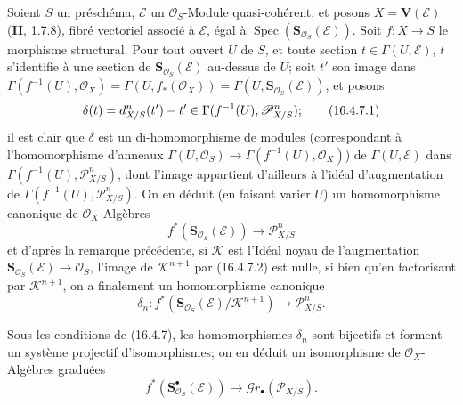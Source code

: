 \begin{env}[16.4.7]
\label{IV.16.4.7}
Soient $S$ un préschéma, $\mathscr{E}$ un $\mathcal{O}_S$-Module
quasi-cohérent, et posons $X=\mathbf{V}(\mathscr{E})$ (\textbf{II}, 1.7.8), fibré
vectoriel associé à $\mathscr{E}$, égal à
$\operatorname{Spec}(\mathbf{S}_{\mathcal{O}_S}(\mathscr{E}))$. Soit
$f:X\to S$ le morphisme structural. Pour tout ouvert $U$ de $S$, et toute
section $t\in\Gamma(U,\mathscr{E})$, $t$ s'identifie à une section de
$\mathbf{S}_{\mathcal{O}_S}(\mathscr{E})$ au-dessus de $U$; soit $t'$ son
image dans
$\Gamma(f^{-1}(U),\mathcal{O}_X)=\Gamma(U,f_*(\mathcal{O}_X))=
\Gamma(U,\mathbf{S}_{\mathcal{O}_S}(\mathscr{E}))$, et posons
\[
  \delta(t)=d_{X/S}^n(t')- t'\in
  \Gamma(f^{-1}(U),\mathscr{P}_{X/S}^n);
  \tag{16.4.7.1}
  \label{IV.16.4.7.1}
\]
il est clair que $\delta$ est un di-homomorphisme de modules (correspondant à
l'homomorphisme d'anneaux
$\Gamma(U,\mathcal{O}_S)\to\Gamma(f^{-1}(U),\mathcal{O}_X)$) de
$\Gamma(U,\mathscr{E})$ dans $\Gamma(f^{-1}(U),\mathscr{P}_{X/S}^n)$, dont
l'image appartient d'ailleurs à l'idéal d'augmentation de
$\Gamma(f^{-1}(U),\mathscr{P}_{X/S}^n)$. On en déduit (en faisant varier $U$)
un homomorphisme canonique de $\mathcal{O}_X$-Algèbres
\[
  f^*(\mathbf{S}_{\mathcal{O}_S}(\mathscr{E}))
  \longrightarrow\mathscr{P}_{X/S}^n
  \tag{16.4.7.2}
  \label{IV.16.4.7.2}
\]
et d'après la remarque précédente, si $\mathscr{K}$ est l'Idéal noyau de
l'augmentation $\mathbf{S}_{\mathcal{O}_S}(\mathscr{E})\to\mathcal{O}_S$,
l'image de $\mathscr{K}^{n+1}$ par (16.4.7.2) est nulle, si bien qu'en
factorisant par $\mathscr{K}^{n+1}$, on a finalement un homomorphisme canonique
\[
  \delta_n:f^*(\mathbf{S}_{\mathcal{O}_S}(\mathscr{E})/
  \mathscr{K}^{n+1})\longrightarrow\mathscr{P}_{X/S}^n.
  \tag{16.4.7.3}
  \label{IV.16.4.7.3}
\]
\end{env}

\begin{proposition}[16.4.8]
\label{IV.16.4.8}
Sous les conditions de \textup{(16.4.7)}, les homomorphismes $\delta_n$ sont bijectifs et
forment un système projectif d'isomorphismes; on en déduit un isomorphisme de
$\mathcal{O}_X$-Algèbres graduées
\[
  f^*(\mathbf{S}_{\mathcal{O}_S}^{\bullet}(\mathscr{E}))
  \longrightarrow\mathscr{G}r_\bullet(\mathscr{P}_{X/S}).
  \tag{16.4.8.1}
  \label{IV.16.4.8.1}
\]
\end{proposition}


